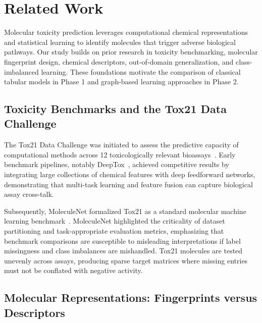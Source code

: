 \section{Related Work}
\label{sec:related_work}

Molecular toxicity prediction leverages computational chemical representations and statistical learning to identify molecules that trigger adverse biological pathways. Our study builds on prior research in toxicity benchmarking, molecular fingerprint design, chemical descriptors, out-of-domain generalization, and class-imbalanced learning. These foundations motivate the comparison of classical tabular models in Phase 1 and graph-based learning approaches in Phase 2.

\subsection{Toxicity Benchmarks and the Tox21 Data Challenge}

The Tox21 Data Challenge was initiated to assess the predictive capacity of computational methods across 12 toxicologically relevant bioassays~\cite{tox21}. Early benchmark pipelines, notably DeepTox~\cite{mayr2016deeptox}, achieved competitive results by integrating large collections of chemical features with deep feedforward networks, demonstrating that multi-task learning and feature fusion can capture biological assay cross-talk. 

Subsequently, MoleculeNet formalized Tox21 as a standard molecular machine learning benchmark~\cite{wu2018moleculenet}. MoleculeNet highlighted the criticality of dataset partitioning and task-appropriate evaluation metrics, emphasizing that benchmark comparisons are susceptible to misleading interpretations if label missingness and class imbalances are mishandled. Tox21 molecules are tested unevenly across assays, producing sparse target matrices where missing entries must not be conflated with negative activity.

\subsection{Molecular Representations: Fingerprints versus Descriptors}

